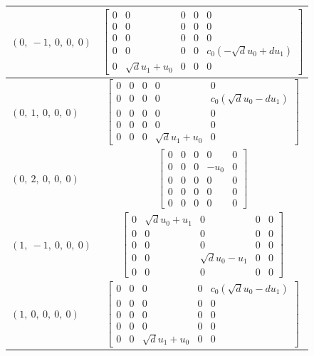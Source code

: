 \documentclass[11pt]{article}
\theoremstyle{definition}
\begin{document}
\begin{tabular}{|l|c|}
    \hline
    $\left( 0, \  -1, \  0, \  0, \  0\right)$ & $\left[\begin{matrix}0 & 0 & 0 & 0 & 0\\0 & 0 & 0 & 0 & 0\\0 & 0 & 0 & 0 & 0\\0 & 0 & 0 & 0 & c_{0} \left(- \sqrt{d} u_{0} + d u_{1}\right)\\0 & \sqrt{d} u_{1} + u_{0} & 0 & 0 & 0\end{matrix}\right]$ \\
    \hline
    $\left( 0, \  1, \  0, \  0, \  0\right)$ & $\left[\begin{matrix}0 & 0 & 0 & 0 & 0\\0 & 0 & 0 & 0 & c_{0} \left(\sqrt{d} u_{0} - d u_{1}\right)\\0 & 0 & 0 & 0 & 0\\0 & 0 & 0 & 0 & 0\\0 & 0 & 0 & \sqrt{d} u_{1} + u_{0} & 0\end{matrix}\right]$ \\
    \hline
    $\left( 0, \  2, \  0, \  0, \  0\right)$ & $\left[\begin{matrix}0 & 0 & 0 & 0 & 0\\0 & 0 & 0 & - u_{0} & 0\\0 & 0 & 0 & 0 & 0\\0 & 0 & 0 & 0 & 0\\0 & 0 & 0 & 0 & 0\end{matrix}\right]$ \\
    \hline
    $\left( 1, \  -1, \  0, \  0, \  0\right)$ & $\left[\begin{matrix}0 & \sqrt{d} u_{0} + u_{1} & 0 & 0 & 0\\0 & 0 & 0 & 0 & 0\\0 & 0 & 0 & 0 & 0\\0 & 0 & \sqrt{d} u_{0} - u_{1} & 0 & 0\\0 & 0 & 0 & 0 & 0\end{matrix}\right]$ \\
    \hline
    $\left( 1, \  0, \  0, \  0, \  0\right)$ & $\left[\begin{matrix}0 & 0 & 0 & 0 & c_{0} \left(\sqrt{d} u_{0} - d u_{1}\right)\\0 & 0 & 0 & 0 & 0\\0 & 0 & 0 & 0 & 0\\0 & 0 & 0 & 0 & 0\\0 & 0 & \sqrt{d} u_{1} + u_{0} & 0 & 0\end{matrix}\right]$ \\

\end{tabular}
\end{document}
